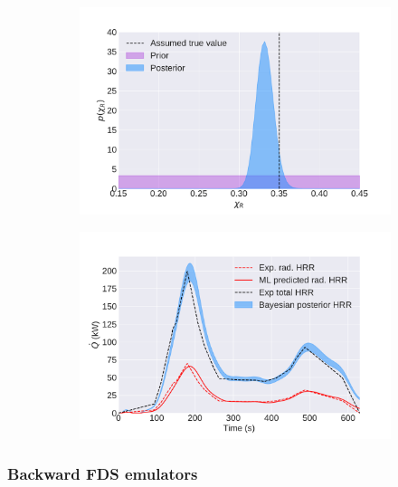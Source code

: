 \documentclass{article}
\begin{document}
\begin{figure}[htbp]
  \centering
  \begin{subfigure}[t]{.45\textwidth}
      \centering
      \includegraphics[width=\textwidth,keepaspectratio]{figures/bayes_distributions.pdf}
      \caption{}
      \label{fig:bayes_distributions}
  \end{subfigure}
  \begin{subfigure}[t]{.45\textwidth}
      \centering
      \includegraphics[width=\textwidth ,keepaspectratio]{figures/bayes_burner_result.pdf}
      \caption{}
      \label{fig:burner_result}
  \end{subfigure}
  \caption{} 
  \label{fig:bayes_result}
\end{figure}

\clearpage
\subsubsection{Backward FDS emulators}
\end{document}
